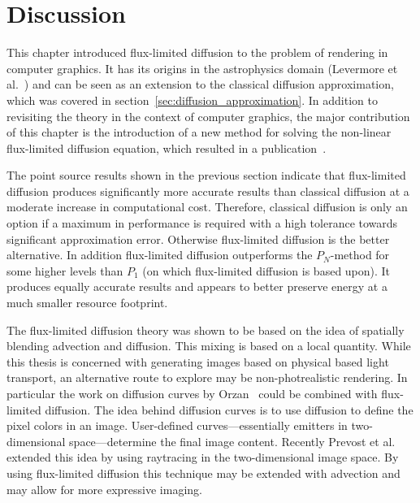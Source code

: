 \section{Discussion}
\label{sec:fld_discussion}

This chapter introduced flux-limited diffusion to the problem of rendering in computer graphics. It has its origins in the astrophysics domain (Levermore et al.~\cite{Levermore81}) and can be seen as an extension to the classical diffusion approximation, which was covered in section~\ref{sec:diffusion_approximation}. In addition to revisiting the theory in the context of computer graphics, the major contribution of this chapter is the introduction of a new method for solving the non-linear flux-limited diffusion equation, which resulted in a publication~\cite{Koerner14}.

The point source results shown in the previous section indicate that flux-limited diffusion produces significantly more accurate results than classical diffusion at a moderate increase in computational cost. Therefore, classical diffusion is only an option if a maximum in performance is required with a high tolerance towards significant approximation error. Otherwise flux-limited diffusion is the better alternative. In addition flux-limited diffusion outperforms the $P_N$-method for some higher levels than $P_1$ (on which flux-limited diffusion is based upon). It produces equally accurate results and appears to better preserve energy at a much smaller resource footprint.

The flux-limited diffusion theory was shown to be based on the idea of spatially blending advection and diffusion. This mixing is based on a local quantity. While this thesis is concerned with generating images based on physical based light transport, an alternative route to explore may be non-photrealistic rendering. In particular the work on diffusion curves by Orzan~\cite{Orzan08} could be combined with flux-limited diffusion. The idea behind diffusion curves is to use diffusion to define the pixel colors in an image. User-defined curves---essentially emitters in two-dimensional space---determine the final image content. Recently Prevost et al.~\cite{Prevost15} extended this idea by using raytracing in the two-dimensional image space. By using flux-limited diffusion this technique may be extended with advection and may allow for more expressive imaging.

